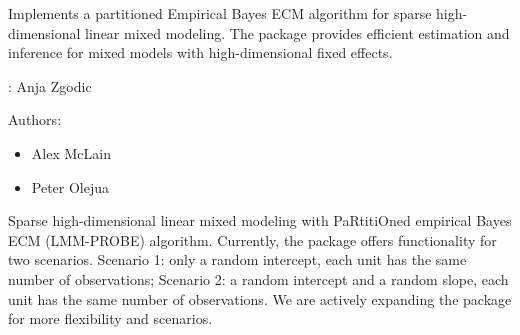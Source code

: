 \documentclass[a4paper]{book}
\begin{document}
%
\begin{Description}
Implements a partitioned Empirical Bayes ECM algorithm for sparse high-dimensional linear mixed modeling. The package provides efficient estimation and inference for mixed models with high-dimensional fixed effects.
\end{Description}
%
\begin{Author}
: Anja Zgodic 

Authors:
\begin{itemize}

\item{} Alex McLain
\item{} Peter Olejua

\end{itemize}


\end{Author}
%
\begin{Description}
Sparse high-dimensional linear mixed modeling with PaRtitiOned empirical Bayes ECM (LMM-PROBE) algorithm. Currently, the package offers functionality for two scenarios. Scenario 1: only a random intercept, each unit has the same number of observations; Scenario 2: a random intercept and a random slope, each unit has the same number of observations. We are actively expanding the package for more flexibility and scenarios.
\end{Description}
%
\end{document}
